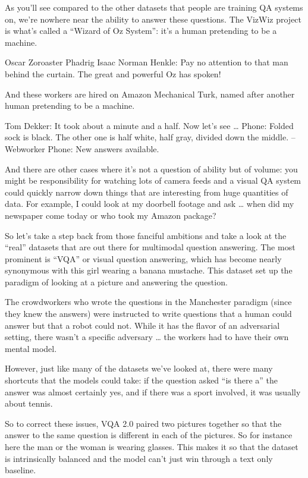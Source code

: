 As you’ll see compared to the other datasets that people are training QA systems on, we’re nowhere near the ability to answer these questions.  The VizWiz project is what’s called a “Wizard of Oz System”: it’s a human pretending to be a machine.

Oscar Zoroaster Phadrig Isaac Norman Henkle: Pay no attention to that man behind the curtain.  The great and powerful Oz has spoken!

And these workers are hired on Amazon Mechanical Turk, named after another human pretending to be a machine.

Tom Dekker: It took about a minute and a half.  Now let’s see …
Phone: Folded sock is black.  The other one is half white, half gray, divided down the middle.  –Webworker
Phone: New answers available.

And there are other cases where it’s not a question of ability but of volume: you might be responsibility for watching lots of camera feeds and a visual QA system could quickly narrow down things that are interesting from huge quantities of data.  For example, I could look at my doorbell footage and ask … when did my newspaper come today or who took my Amazon package?

So let’s take a step back from those fanciful ambitions and take a look at the “real” datasets that are out there for multimodal question answering.  The most prominent is “VQA” or visual question answering, which has become nearly synonymous with this girl wearing a banana mustache.  This dataset set up the paradigm of looking at a picture and answering the question.

The crowdworkers who wrote the questions in the Manchester paradigm (since they knew the answers) were instructed to write questions that a human could answer but that a robot could not.  While it has the flavor of an adversarial setting, there wasn’t a specific adversary … the workers had to have their own mental model.

However, just like many of the datasets we’ve looked at, there were many shortcuts that the models could take: if the question asked “is there a” the answer was almost certainly yes, and if there was a sport involved, it was usually about tennis.

So to correct these issues, VQA 2.0 paired two pictures together so that the answer to the same question is different in each of the pictures.  So for instance here the man or the woman is wearing glasses.  This makes it so that the dataset is intrinsically balanced and the model can’t just win through a text only baseline.

